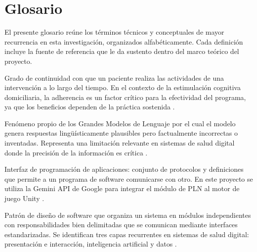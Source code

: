 \section
{Glosario}
\label{cap:glosario}

El presente glosario reúne los términos técnicos y conceptuales de mayor 
recurrencia en esta investigación, organizados alfabéticamente. Cada 
definición incluye la fuente de referencia que le da sustento dentro del 
marco teórico del proyecto.

\begin{description}[leftmargin=0pt, labelwidth=\textwidth, 
                    labelsep=0pt, style=nextline]

\item[\textbf{Adherencia al tratamiento}]
Grado de continuidad con que un paciente realiza las actividades de una 
intervención a lo largo del tiempo. En el contexto de la estimulación 
cognitiva domiciliaria, la adherencia es un factor crítico para la 
efectividad del programa, ya que los beneficios dependen de la práctica 
sostenida \parencite{moret, calatayud2021}.

\item[\textbf{Alucinación (LLMs)}]
Fenómeno propio de los Grandes Modelos de Lenguaje por el cual el modelo 
genera respuestas lingüísticamente plausibles pero factualmente incorrectas 
o inventadas. Representa una limitación relevante en sistemas de salud 
digital donde la precisión de la información es crítica \parencite{moret}.

\item[\textbf{API (\textit{Application Programming Interface})}]
Interfaz de programación de aplicaciones: conjunto de protocolos y 
definiciones que permite a un programa de software comunicarse con otro. 
En este proyecto se utiliza la Gemini API de Google para integrar el 
módulo de PLN al motor de juego Unity \parencite{Ortega2024}.

\item[\textbf{Arquitectura por capas}]
Patrón de diseño de software que organiza un sistema en módulos 
independientes con responsabilidades bien delimitadas que se comunican 
mediante interfaces estandarizadas. Se identifican tres capas recurrentes 
en sistemas de salud digital: presentación e interacción, inteligencia 
artificial y datos \parencite{Goumopoulos2021, Karapapas2021}.


\end{description}
